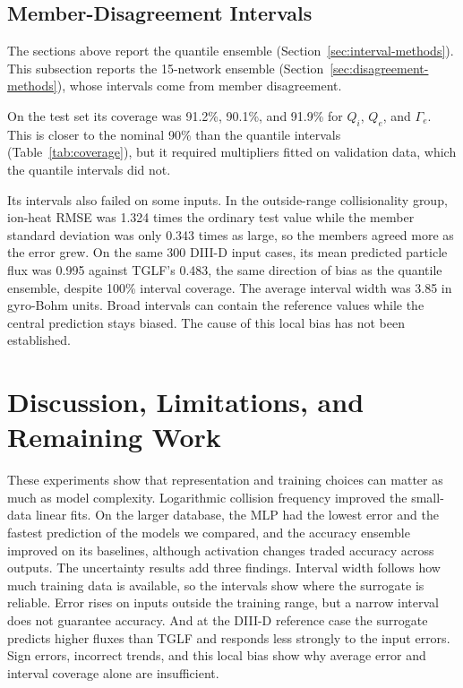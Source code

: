 \documentclass[12pt,letterpaper]{article}
\begin{document}
\subsection{Member-Disagreement Intervals}
\label{sec:disagreement-results}

The sections above report the quantile ensemble
(Section~\ref{sec:interval-methods}). This subsection reports the
15-network ensemble (Section~\ref{sec:disagreement-methods}), whose
intervals come from member disagreement.

On the test set its coverage was 91.2\%, 90.1\%, and 91.9\% for $Q_i$, $Q_e$,
and $\Gamma_e$. This is closer to the nominal 90\% than the quantile intervals
(Table~\ref{tab:coverage}), but it required multipliers fitted on validation
data, which the quantile intervals did not.

Its intervals also failed on some inputs. In the outside-range collisionality
group, ion-heat RMSE was 1.324 times the ordinary test value while the member
standard deviation was only 0.343 times as large, so the members agreed more
as the error grew. On the same 300 DIII-D input cases, its mean predicted
particle flux was 0.995 against TGLF's 0.483, the same direction of bias as the
quantile ensemble, despite 100\% interval coverage. The average interval width
was 3.85 in gyro-Bohm units. Broad intervals can contain the reference values
while the central prediction stays biased. The cause of this local bias has not
been established.

\section{Discussion, Limitations, and Remaining Work}
\label{sec:discussion}

These experiments show that representation and training choices can matter
as much as model complexity. Logarithmic collision frequency improved the
small-data linear fits. On the larger database, the MLP had the lowest error
and the fastest prediction of the models we compared, and the accuracy
ensemble improved on its baselines, although activation changes traded
accuracy across outputs. The uncertainty results add three findings. Interval
width follows how much training data is available, so the intervals show where
the surrogate is reliable. Error rises on inputs outside the training range,
but a narrow interval does not guarantee accuracy. And at the DIII-D reference
case the surrogate predicts higher fluxes than TGLF and responds less strongly
to the input errors. Sign errors, incorrect trends, and this local bias show
why average error and interval coverage alone are insufficient.
\end{document}
